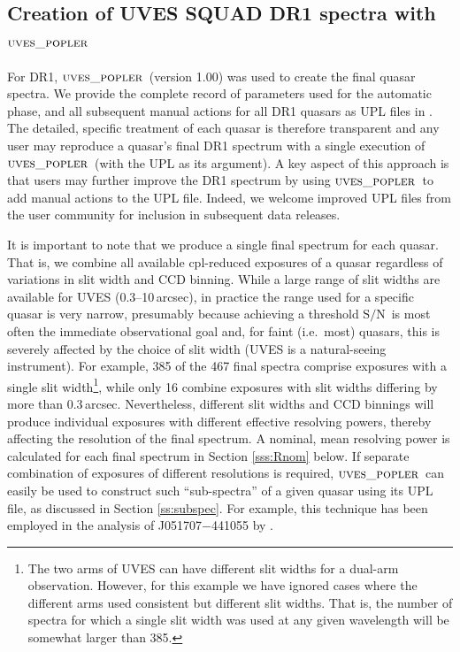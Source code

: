 \documentclass[fleqn,usenatbib,usedcolumn]{mnras}
\newcommand{\Sref}[1]{Section \ref{#1}}
\newcommand{\SN}{\ensuremath{\textrm{S/N}}}
\newcommand{\popler}{\ensuremath{\textsc{uves\_popler}}}
\begin{document}
\subsection{Creation of UVES SQUAD DR1 spectra with \popler}\label{ss:poplerDR1}

For DR1, \popler\ (version 1.00) was used to create the final quasar spectra. We provide the complete record of parameters used for the automatic phase, and all subsequent manual actions for all DR1 quasars as UPL files in \citet{Murphy:2018:UVESSQUADDR1}. The detailed, specific treatment of each quasar is therefore transparent and any user may reproduce a quasar's final DR1 spectrum with a single execution of \popler\ (with the UPL as its argument). A key aspect of this approach is that users may further improve the DR1 spectrum by using \popler\ to add manual actions to the UPL file. Indeed, we welcome improved UPL files from the user community for inclusion in subsequent data releases.

It is important to note that we produce a single final spectrum for each quasar. That is, we combine all available {\sc cpl}-reduced exposures of a quasar regardless of variations in slit width and CCD binning. While a large range of slit widths are available for UVES (0.3--10\,arcsec), in practice the range used for a specific quasar is very narrow, presumably because achieving a threshold \SN\ is most often the immediate observational goal and, for faint (i.e.\ most) quasars, this is severely affected by the choice of slit width (UVES is a natural-seeing instrument). For example, 385 of the 467 final spectra comprise exposures with a single slit width\footnote{The two arms of UVES can have different slit widths for a dual-arm observation. However, for this example we have ignored cases where the different arms used consistent but different slit widths. That is, the number of spectra for which a single slit width was used at any given wavelength will be somewhat larger than 385.}, while only 16 combine exposures with slit widths differing by more than 0.3\,arcsec. Nevertheless, different slit widths and CCD binnings will produce individual exposures with different effective resolving powers, thereby affecting the resolution of the final spectrum. A nominal, mean resolving power is calculated for each final spectrum in \Sref{sss:Rnom} below. If separate combination of exposures of different resolutions is required, \popler\ can easily be used to construct such ``sub-spectra'' of a given quasar using its UPL file, as discussed in \Sref{ss:subspec}. For example, this technique has been employed in the analysis of J051707$-$441055 by \citet{Kotus:2017:3679}.
\end{document}
